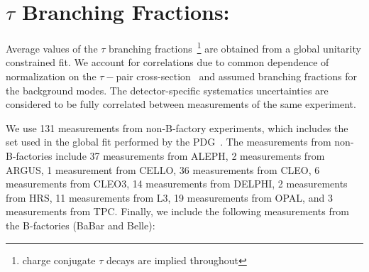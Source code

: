 \documentclass[fleqn,twoside]{article}
\begin{document}
\section{$\tau$ Branching Fractions:}
\label{sec:Tau_BR}

Average values of the $\tau$ branching fractions~\footnote{charge conjugate $\tau$ decays are implied throughout}
are obtained from a global unitarity constrained fit.
We account for correlations due to common dependence of
normalization on the $\tau-$pair cross-section~\cite{Banerjee:2007is}
and assumed branching fractions for the background modes. 
The detector-specific systematics uncertainties are considered to be fully correlated between
measurements of the same experiment.

We use 131 measurements from non-B-factory experiments, 
which includes the set used in the global fit performed by the PDG~\cite{PDG_2010}. 
The measurements from non-B-factories include
     37 measurements from ALEPH,
      2 measurements from ARGUS,
      1 measurement from CELLO,
     36 measurements from CLEO,
      6 measurements from CLEO3,
     14 measurements from DELPHI,
      2 measurements from HRS,
     11 measurements from L3,
     19 measurements from OPAL, and
      3 measurements from TPC.
Finally, we include the following measurements from the B-factories (BaBar and Belle):
\end{document}
